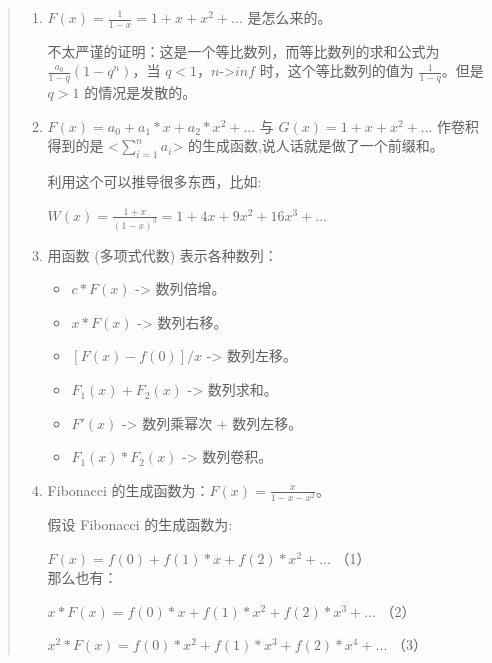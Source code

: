 \documentclass[a4paper,12pt]{article}
\begin{document}
\begin{quote}
\begin{enumerate}
\def\labelenumi{\arabic{enumi}.}
\item
    \(F(x) = \frac{1}{1-x} = 1 + x + x^2 + ...\) 是怎么来的。

    不太严谨的证明：这是一个等比数列，而等比数列的求和公式为
    \(\frac{a_0}{1-q}(1-q^n)\)，当 \(q<1，n\)-\textgreater{}\(inf\)
    时，这个等比数列的值为 \(\frac{1}{1-q}\)。但是 \(q>1\)
    的情况是发散的。\\
\item
    \(F(x) = a_0 + a_1 * x + a_2 * x^2 + ... \) 与
    \(G(x) = 1 + x + x^2 + ...\) 作卷积得到的是
    \textless{}\(\sum_{i=1}^n  a_i\)\textgreater{} 的生成函数,说人话就是做了一个前缀和。

    利用这个可以推导很多东西，比如:

    \(W(x) = \frac{1+x}{(1-x)^3} = 1 + 4 x + 9 x^2 + 16 x^3 + ...\)\ \\
\item
    用函数 (多项式代数) 表示各种数列：

    \begin{itemize}
    \item
    \(c * F(x)\) -\textgreater{} 数列倍增。
    \item
    \(x * F(x)\) -\textgreater{} 数列右移。
    \item
    \([F(x) - f(0)] / x\) -\textgreater{} 数列左移。
    \item
    \(F_1(x) + F_2(x)\) -\textgreater{} 数列求和。
    \item
    \(F'(x)\) -\textgreater{} 数列乘幂次 + 数列左移。
    \item
    \(F_1(x) * F_2(x)\) -\textgreater{} 数列卷积。
    \\
    \end{itemize}

\item
    Fibonacci 的生成函数为：\(F(x) = \frac{x}{1-x-x^2}\)。

    假设 Fibonacci 的生成函数为:

    \(F(x) = f(0) + f(1)*x + f(2)*x^2 + ...\) （1）\\

    那么也有：

    \(x * F(x) = f(0) * x + f(1) * x^2 + f(2) * x^3 + ...\) （2）

    \(x^2 * F(x) = f(0) * x^2 + f(1) * x^3 + f(2) * x^4 + ...\) （3）\\


\end{enumerate}
\end{quote}
\end{document}
